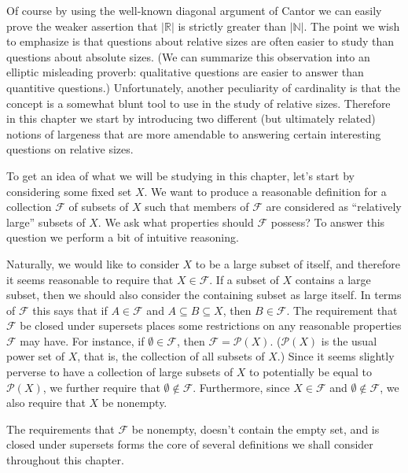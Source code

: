 \documentclass[12pt]{article}
\theoremstyle{plain}
\theoremstyle{definition}
\newcommand{\bbN}{\mathbb{N}}
\newcommand{\bbR}{\mathbb{R}}
\newcommand{\calF}{\mathcal{F}}
\newcommand{\calP}{\mathcal{P}}
\begin{document}
Of course by using the well-known diagonal argument of Cantor%
we can easily prove the weaker assertion that $|\bbR|$ is strictly greater than $|\bbN|$.
The point we wish to emphasize is that questions about relative sizes are often easier to study than questions about absolute sizes.
(We can summarize this observation into an elliptic misleading proverb: qualitative questions are easier to answer than quantitive questions.)
Unfortunately, another peculiarity of cardinality is that the concept is a somewhat blunt tool to use in the study of relative sizes.
Therefore in this chapter we start by introducing two different (but ultimately related) notions of largeness that are more amendable to answering certain interesting questions on relative sizes.

To get an idea of what we will be studying in this chapter, let's start by considering some fixed set $X$.
We want to produce a reasonable definition for a collection $\calF$ of subsets of $X$ such that members of $\calF$ are considered as ``relatively large'' subsets of $X$.
We ask what properties should $\calF$ possess?
To answer this question we perform a bit of intuitive reasoning.

Naturally, we would like to consider $X$ to be a large subset of itself, and therefore it seems reasonable to require that $X \in \calF$.
If a subset of $X$ contains a large subset, then we should also consider the containing subset as large itself.
In terms of $\calF$ this says that if $A \in \calF$ and $A \subseteq B \subseteq X$, then $B \in \calF$. 
The requirement that $\calF$ be closed under supersets places some restrictions on any reasonable properties $\calF$ may have.
For instance, if $\emptyset \in \calF$, then $\calF = \calP(X)$. 
($\calP(X)$ is the usual power set of $X$, that is, the collection of all subsets of $X$.)
Since it seems slightly perverse to have a collection of large subsets of $X$ to potentially be equal to $\calP(X)$, we further require that $\emptyset \not\in \calF$. 
Furthermore, since $X \in \calF$ and $\emptyset \not\in \calF$, we also require that $X$ be nonempty.

The requirements that $\calF$ be nonempty, doesn't contain the empty set, and is closed under supersets forms the core of several definitions we shall consider throughout this chapter. 
\end{document}
